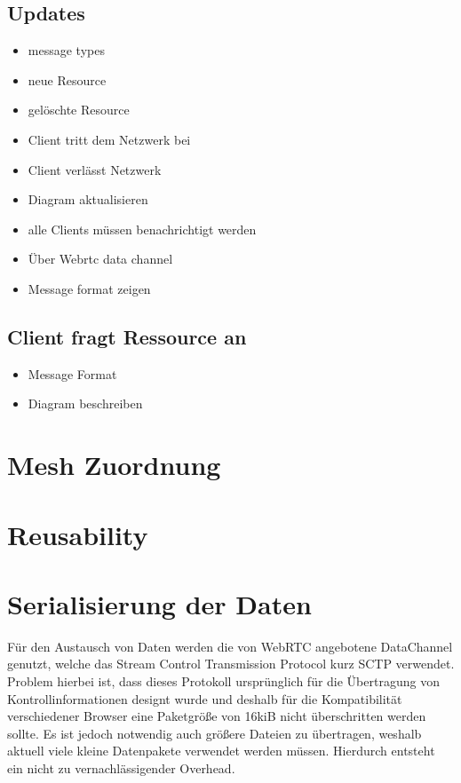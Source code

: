 \subsection{Updates}
\begin{itemize}
	\item message types
	\item neue Resource
	\item gelöschte Resource
	\item Client tritt dem Netzwerk bei
	\item Client verlässt Netzwerk
	\item Diagram aktualisieren
	\item alle Clients müssen benachrichtigt werden
	\item Über Webrtc data channel
	\item Message format zeigen
\end{itemize}
\subsection{Client fragt Ressource an}
\begin{itemize}
	\item Message Format
	\item Diagram beschreiben
\end{itemize}
\section{Mesh Zuordnung}

\section{Reusability}

\section{Serialisierung der Daten}
Für den Austausch von Daten werden die von WebRTC angebotene DataChannel genutzt, welche das Stream Control Transmission Protocol kurz SCTP verwendet. Problem hierbei ist, dass dieses Protokoll ursprünglich für die Übertragung von Kontrollinformationen designt wurde und deshalb für die Kompatibilität verschiedener Browser eine Paketgröße von 16kiB nicht überschritten werden sollte. Es ist jedoch notwendig auch größere Dateien zu übertragen, weshalb aktuell viele kleine Datenpakete verwendet werden müssen. Hierdurch entsteht ein nicht zu vernachlässigender Overhead.

